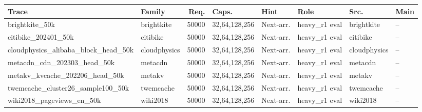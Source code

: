 \begin{tabular}{@{}l l r l l l l l@{}}
\toprule
Trace & Family & Req. & Caps. & Hint & Role & Src. & Main \\
\midrule
brightkite\_50k & brightkite & 50000 & 32,64,128,256 & Next-arr. & heavy\_r1 eval & brightkite & -- \\
citibike\_202401\_50k & citibike & 50000 & 32,64,128,256 & Next-arr. & heavy\_r1 eval & citibike & -- \\
cloudphysics\_alibaba\_block\_head\_50k & cloudphysics & 50000 & 32,64,128,256 & Next-arr. & heavy\_r1 eval & cloudphysics & -- \\
metacdn\_cdn\_202303\_head\_50k & metacdn & 50000 & 32,64,128,256 & Next-arr. & heavy\_r1 eval & metacdn & -- \\
metakv\_kvcache\_202206\_head\_50k & metakv & 50000 & 32,64,128,256 & Next-arr. & heavy\_r1 eval & metakv & -- \\
twemcache\_cluster26\_sample100\_50k & twemcache & 50000 & 32,64,128,256 & Next-arr. & heavy\_r1 eval & twemcache & -- \\
wiki2018\_pageviews\_en\_50k & wiki2018 & 50000 & 32,64,128,256 & Next-arr. & heavy\_r1 eval & wiki2018 & -- \\
\bottomrule
\end{tabular}
